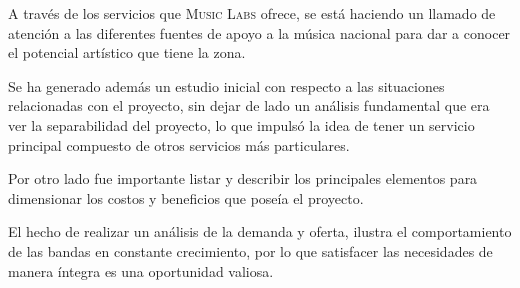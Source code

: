 A través de los servicios que \textsc{Music Labs} ofrece,
se está haciendo un llamado de atención
a las diferentes fuentes de apoyo a la música nacional
para dar a conocer el potencial artístico que tiene la zona.

Se ha generado además un estudio inicial con respecto
a las situaciones relacionadas con el proyecto,
sin dejar de lado un análisis fundamental que era ver
la separabilidad del proyecto, lo que impulsó
la idea de tener un servicio principal
compuesto de otros servicios más particulares.

Por otro lado fue importante listar y describir
los principales elementos para dimensionar los costos
y beneficios que poseía el proyecto. 

El hecho de realizar un análisis de la demanda y oferta, ilustra
el comportamiento de las bandas en constante crecimiento, por lo que
satisfacer las necesidades de manera íntegra es una oportunidad valiosa.
